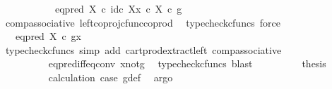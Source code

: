 \begin{isabellebody}
\ \ \ \ \ \ \ \ \ \ {\isacharequal}{\kern0pt}\ {\isacharparenleft}{\kern0pt}eq{\isacharunderscore}{\kern0pt}pred\ X\ {\isasymcirc}\isactrlsub c\ {\isasymlangle}id\isactrlsub c\ X{\isacharcomma}{\kern0pt}x\ {\isasymcirc}\isactrlsub c\ {\isasymbeta}\isactrlbsub X\isactrlesub {\isasymrangle}{\isacharparenright}{\kern0pt}\ {\isasymcirc}\isactrlsub c\ g{\isachardoublequoteclose}\isanewline
\ \ \ \ \ \ \ \ \isamarkupfalse%
\ comp{\isacharunderscore}{\kern0pt}associative{}\ left{\isacharunderscore}{\kern0pt}coproj{\isacharunderscore}{\kern0pt}cfunc{\isacharunderscore}{\kern0pt}coprod\ \isamarkupfalse%
\ {\isacharparenleft}{\kern0pt}typecheck{\isacharunderscore}{\kern0pt}cfuncs{\isacharcomma}{\kern0pt}\ force{\isacharparenright}{\kern0pt}\isanewline
\ \ \ \ \ \ \isamarkupfalse%
\ \isamarkupfalse%
\ {\isachardoublequoteopen}{\isachardot}{\kern0pt}{\isachardot}{\kern0pt}{\isachardot}{\kern0pt}\ {\isacharequal}{\kern0pt}\ eq{\isacharunderscore}{\kern0pt}pred\ X\ {\isasymcirc}\isactrlsub c\ {\isasymlangle}g{\isacharcomma}{\kern0pt}x{\isasymrangle}{\isachardoublequoteclose}\isanewline
\ \ \ \ \ \ \ \ \isamarkupfalse%
\ {\isacharparenleft}{\kern0pt}typecheck{\isacharunderscore}{\kern0pt}cfuncs{\isacharcomma}{\kern0pt}\ simp\ add{\isacharcolon}{\kern0pt}\ cart{\isacharunderscore}{\kern0pt}prod{\isacharunderscore}{\kern0pt}extract{\isacharunderscore}{\kern0pt}left\ comp{\isacharunderscore}{\kern0pt}associative{}{\isacharparenright}{\kern0pt}\isanewline
\ \ \ \ \ \ \isamarkupfalse%
\ \isamarkupfalse%
\ {\isachardoublequoteopen}{\isachardot}{\kern0pt}{\isachardot}{\kern0pt}{\isachardot}{\kern0pt}\ {\isacharequal}{\kern0pt}\ {\isasymf}{\isachardoublequoteclose}\isanewline
\ \ \ \ \ \ \ \ \isamarkupfalse%
\ eq{\isacharunderscore}{\kern0pt}pred{\isacharunderscore}{\kern0pt}iff{\isacharunderscore}{\kern0pt}eq{\isacharunderscore}{\kern0pt}conv\ x{\isacharunderscore}{\kern0pt}not{\isacharunderscore}{\kern0pt}g\ \isamarkupfalse%
\ {\isacharparenleft}{\kern0pt}typecheck{\isacharunderscore}{\kern0pt}cfuncs{\isacharcomma}{\kern0pt}\ blast{\isacharparenright}{\kern0pt}\isanewline
\ \ \ \ \ \ \isamarkupfalse%
\ \isamarkupfalse%
\ {\isacharquery}{\kern0pt}thesis\isanewline
\ \ \ \ \ \ \ \ \isamarkupfalse%
\ calculation\ case{}\ g{\isacharunderscore}{\kern0pt}def\ \isamarkupfalse%
\ argo\isanewline
\ \ \ \ \isamarkupfalse%

\end{isabellebody}

